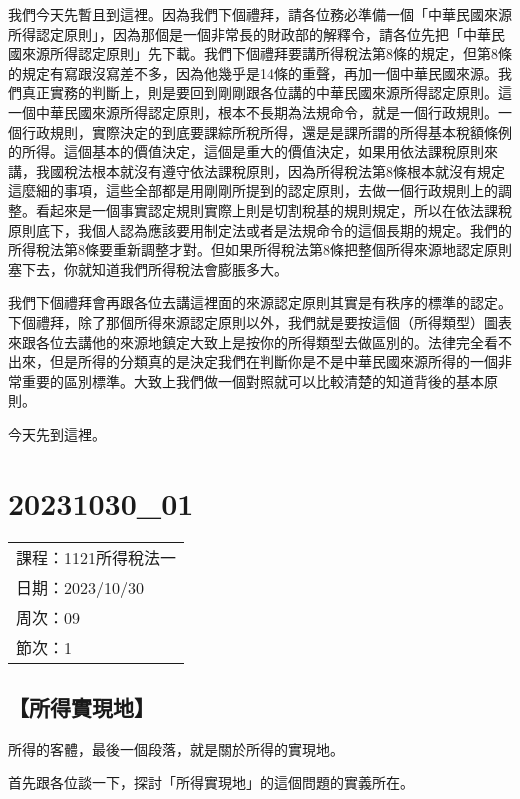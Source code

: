 \documentclass[]{ctexbook}
\begin{document}
我們今天先暫且到這裡。因為我們下個禮拜，請各位務必準備一個「中華民國來源所得認定原則」，因為那個是一個非常長的財政部的解釋令，請各位先把「中華民國來源所得認定原則」先下載。我們下個禮拜要講所得稅法第8條的規定，但第8條的規定有寫跟沒寫差不多，因為他幾乎是14條的重聲，再加一個中華民國來源。我們真正實務的判斷上，則是要回到剛剛跟各位講的中華民國來源所得認定原則。這一個中華民國來源所得認定原則，根本不長期為法規命令，就是一個行政規則。一個行政規則，實際決定的到底要課綜所稅所得，還是是課所謂的所得基本稅額條例的所得。這個基本的價值決定，這個是重大的價值決定，如果用依法課稅原則來講，我國稅法根本就沒有遵守依法課稅原則，因為所得稅法第8條根本就沒有規定這麼細的事項，這些全部都是用剛剛所提到的認定原則，去做一個行政規則上的調整。看起來是一個事實認定規則實際上則是切割稅基的規則規定，所以在依法課稅原則底下，我個人認為應該要用制定法或者是法規命令的這個長期的規定。我們的所得稅法第8條要重新調整才對。但如果所得稅法第8條把整個所得來源地認定原則塞下去，你就知道我們所得稅法會膨脹多大。

我們下個禮拜會再跟各位去講這裡面的來源認定原則其實是有秩序的標準的認定。下個禮拜，除了那個所得來源認定原則以外，我們就是要按這個（所得類型）圖表來跟各位去講他的來源地鎮定大致上是按你的所得類型去做區別的。法律完全看不出來，但是所得的分類真的是決定我們在判斷你是不是中華民國來源所得的一個非常重要的區別標準。大致上我們做一個對照就可以比較清楚的知道背後的基本原則。

今天先到這裡。

\hypertarget{section-15}{%
\chapter{20231030\_01}\label{section-15}}

\begin{longtable}[]{@{}l@{}}
\toprule()
\endhead
課程：1121所得稅法一 \\
日期：2023/10/30 \\
周次：09 \\
節次：1 \\
\bottomrule()
\end{longtable}

\hypertarget{ux6240ux5f97ux5be6ux73feux5730}{%
\section{【所得實現地】}\label{ux6240ux5f97ux5be6ux73feux5730}}

所得的客體，最後一個段落，就是關於所得的實現地。

首先跟各位談一下，探討「所得實現地」的這個問題的實義所在。
\end{document}
